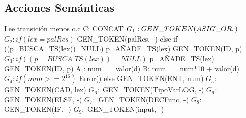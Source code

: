 \documentclass{article}
\begin{document}
\subsection*{Acciones Semánticas}
\medskip
\textnormal{Lee }\forall \textnormal{ transición menos o.c}
\medskip \newline
\textnormal{C: CONCAT}
\medskip \newline
\textnormal{$G_1: GEN\_TOKEN(ASIG\_OR, \-)$}
\medskip \newline
\textnormal{$G_2: if(lex=palRes) $}
\newline 
\textnormal{\hspace{10mm}GEN\_TOKEN(palRes, -)} 
\newline
\textnormal{\hspace{8mm}else if ((p=BUSCA\_TS(lex))=NULL)} 
\newline
\textnormal{\hspace{10mm}p=AÑADE\_TS(lex)} 
\newline
\textnormal{\hspace{8mm}GEN\_TOKEN(ID, p)}
\medskip\newline
\textnormal{$G_3:if ((p=BUSCA\_TS(lex))=NULL)$} 
\newline
\textnormal{\hspace{10mm}p=AÑADE\_TS(lex)} 
\newline
\textnormal{\hspace{8mm}GEN\_TOKEN(ID, p)}
\medskip \newline
\textnormal{A : num $=$ valor(d)}
\medskip \newline
\textnormal{B: num $=$ num$*$10 $+$ valor(d)}
\medskip \newline
\textnormal{$G_4: if(num >= 2^{16}) $}
\newline
\textnormal{\hspace{10mm} Error()}
\newline
\textnormal{\hspace{8mm}else GEN\_TOKEN(ENT, num)} 
\medskip \newline
\textnormal{$G_5:$ GEN\_TOKEN(CAD, lex)}
\medskip \newline
\textnormal{$G_6:$ GEN\_TOKEN(TipoVarLOG, -)}
\medskip \newline
\textnormal{$G_6:$ GEN\_TOKEN(ELSE, -)}
\medskip \newline
\textnormal{$G_7:$ GEN\_TOKEN(DECFunc, -)}
\medskip \newline
\textnormal{$G_8:$ GEN\_TOKEN(IF, -)}
\medskip \newline
\textnormal{$G_9:$ GEN\_TOKEN(input, -)}
\end{document}
